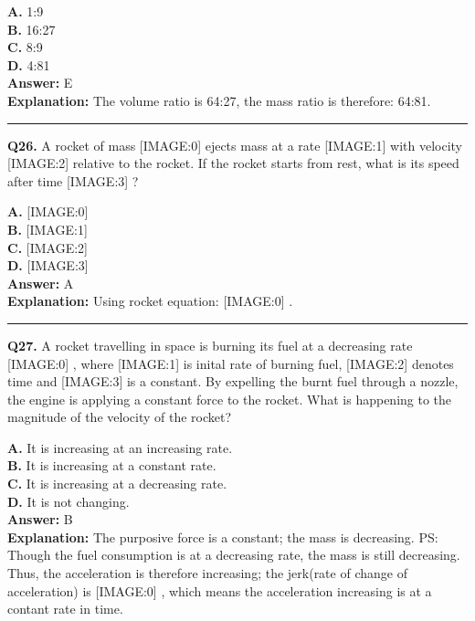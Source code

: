 \documentclass[12pt]{article}
\begin{document}
\textbf{A.} 1:9 \\
\textbf{B.} 16:27 \\
\textbf{C.} 8:9 \\
\textbf{D.} 4:81 \\

\textbf{Answer:} E \\
\textbf{Explanation:} The volume ratio is 64:27, the mass ratio is therefore: 64:81.

\hrule
\vspace{1em}


\noindent
\textbf{Q26.} A rocket of mass
[IMAGE:0]
ejects mass at a rate
[IMAGE:1]
with velocity
[IMAGE:2]
relative to the rocket. If the rocket starts from rest, what is its speed after time
[IMAGE:3]
?



\textbf{A.} [IMAGE:0] \\
\textbf{B.} [IMAGE:1] \\
\textbf{C.} [IMAGE:2] \\
\textbf{D.} [IMAGE:3] \\

\textbf{Answer:} A \\
\textbf{Explanation:} Using rocket equation:
[IMAGE:0]
.

\hrule
\vspace{1em}


\noindent
\textbf{Q27.} A rocket travelling in space is burning its fuel at a decreasing rate
[IMAGE:0]
, where
[IMAGE:1]
is inital rate of burning fuel,
[IMAGE:2]
denotes time and
[IMAGE:3]
is a constant. By expelling the burnt fuel through a nozzle, the engine is applying a constant force to the rocket.
What is happening to the magnitude of the velocity of the rocket?



\textbf{A.} It is increasing at an increasing rate. \\
\textbf{B.} It is increasing at a constant rate. \\
\textbf{C.} It is increasing at a decreasing rate. \\
\textbf{D.} It is not changing. \\

\textbf{Answer:} B \\
\textbf{Explanation:} The purposive force is a constant; the mass is decreasing.
PS: Though the fuel consumption is at a decreasing rate, the mass is still decreasing.
Thus, the acceleration is therefore increasing;
the jerk(rate of change of acceleration) is
[IMAGE:0]
, which means the acceleration increasing is at a contant rate in time.
\end{document}
